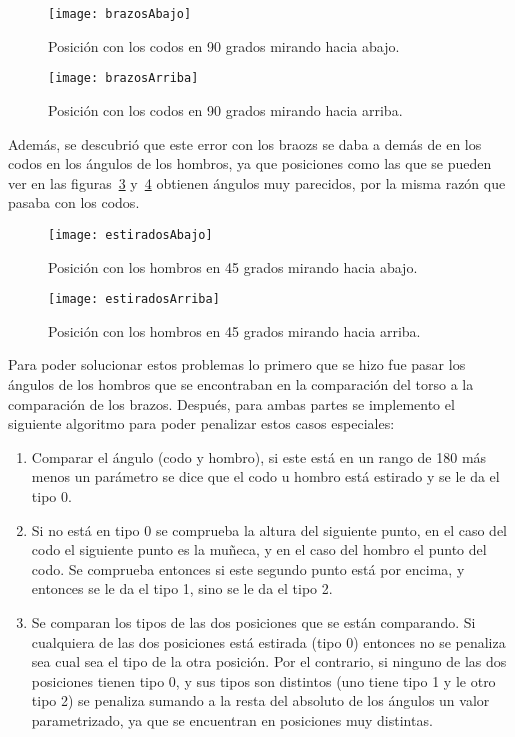 \begin{figure}[h]
	\centering
	\texttt{[image: brazosAbajo]}
	\caption{Posición con los codos en 90 grados mirando hacia abajo.}
	\label{fig:brazosAbajo}
\end{figure}

\begin{figure}[h]
	\centering
	\texttt{[image: brazosArriba]}
	\caption{Posición con los codos en 90 grados mirando hacia arriba.}
	\label{fig:brazosArriba}
\end{figure}

Además, se descubrió que este error con los braozs se daba a demás de en los codos en los ángulos de los hombros, ya que posiciones como las que se pueden ver en las figuras~\ref{fig:estiradosAbajo} y~\ref{fig:estiradosArriba} obtienen ángulos muy parecidos, por la misma razón que pasaba con los codos.

\begin{figure}[h]
	\centering
	\texttt{[image: estiradosAbajo]}
	\caption{Posición con los hombros en 45 grados mirando hacia abajo.}
	\label{fig:estiradosAbajo}
\end{figure}

\begin{figure}[h]
	\centering
	\texttt{[image: estiradosArriba]}
	\caption{Posición con los hombros en 45 grados mirando hacia arriba.}
	\label{fig:estiradosArriba}
\end{figure}

Para poder solucionar estos problemas lo primero que se hizo fue pasar los ángulos de los hombros que se encontraban en la comparación del torso a la comparación de los brazos. Después, para ambas partes se implemento el siguiente algoritmo para poder penalizar estos casos especiales:
\begin{enumerate}
	\item Comparar el ángulo (codo y hombro), si este está en un rango de 180 más menos un parámetro se dice que el codo u hombro está estirado y se le da el tipo 0.
	\item Si no está en tipo 0 se comprueba la altura del siguiente punto, en el caso del codo el siguiente punto es la muñeca, y en el caso del hombro el punto del codo. Se comprueba entonces si este segundo punto está por encima, y entonces se le da el tipo 1, sino se le da el tipo 2.
	\item Se comparan los tipos de las dos posiciones que se están comparando. Si cualquiera de las dos posiciones está estirada (tipo 0) entonces no se penaliza sea cual sea el tipo de la otra posición. Por el contrario, si ninguno de las dos posiciones tienen tipo 0, y sus tipos son distintos (uno tiene tipo 1 y le otro tipo 2) se penaliza sumando a la resta del absoluto de los ángulos un valor parametrizado, ya que se encuentran en posiciones muy distintas.
\end{enumerate}

